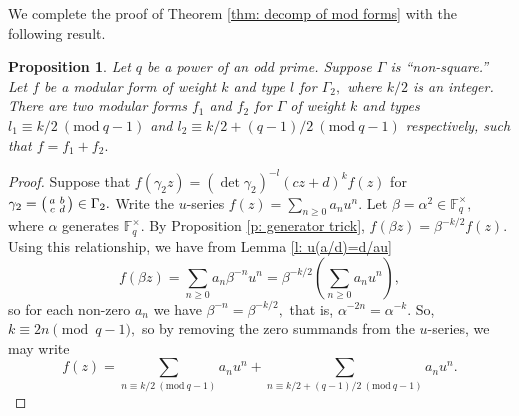 \documentclass[11pt]{amsart}
\newtheorem{proposition}[theorem]{Proposition}
\theoremstyle{definition}
\newenvironment{psmallmatrix}
{\left(\begin{smallmatrix}}
	{\end{smallmatrix}\right)}
\numberwithin{equation}{section}
\newcommand{\bbF}{\mathbb{F}}		%
\newcommand{\jesse}[1]{{\color{blue} \sf $\spadesuit\spadesuit\spadesuit$ Jesse: [#1]}} %
\newcommand{\Mod}[1]{\ (\mathrm{mod}\ #1)}
\begin{document}
We complete the proof of Theorem \ref{thm: decomp of mod forms} with the following result.
\begin{proposition}
	Let $q$ be a power of an odd prime. Suppose $\Gamma$ is ``non-square.''
	Let $f$ be a modular form of weight $k$ and type $l$ for $\Gamma_2,$ where $k/2$ is an integer. 
	There are two modular forms $f_1$ and $f_2$ for $\Gamma$ of weight $k$ and types $l_1\equiv k/2\Mod{q-1}$ and $l_2\equiv k/2+(q-1)/2\Mod{q-1}$ respectively, such that $f=f_1+f_2.$
\end{proposition}
\begin{proof}
Suppose that $f(\gamma_2 z)=(\det\gamma_2)^{-l}(cz+d)^kf(z)$ for $\displaystyle{\gamma_2=\begin{psmallmatrix}a&b\\c&d\end{psmallmatrix}\in \Gamma_2}.$ 
Write the $u$-series $f(z)=\sum_{n\geq 0}a_nu^n.$ Let $\beta = \alpha^2\in \bbF_q^{\times},$ where $\alpha$ generates $\bbF_q^{\times}.$ By Proposition \ref{p: generator trick}, $f(\beta z)=\beta^{-k/2}f(z).$ Using this relationship, we have from Lemma \ref{l: u(a/d)=d/au}
\[f(\beta z)= \sum_{n\geq 0}a_n\beta^{-n}u^n = \beta^{-k/2}\left(\sum_{n\geq 0}a_nu^n\right), \] so for each non-zero $a_n$ we have $\beta^{-n}=\beta^{-k/2},$ that is, $\alpha^{-2n}=\alpha^{-k}.$ So, $k\equiv 2n\pmod{q-1},$ so by removing the zero summands from the $u$-series, we may write
\[f(z)=\sum_{n\equiv k/2\Mod{q-1}}a_nu^n+\sum_{n\equiv k/2+(q-1)/2\Mod{q-1}} a_nu^n. \]



\end{proof}
\end{document}
